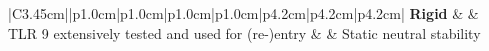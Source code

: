 {\begin{tabular}{|C{3.45cm}||p{1.0cm}|p{1.0cm}|p{1.0cm}|p{1.0cm}|p{4.2cm}|p{4.2cm}|p{4.2cm}|}
		\textbf{\newline \newline Rigid}    &   & TLR 9 \newline extensively tested and used for (re-)entry &               & Static neutral stability \\[13ex] \hline
	\end{tabular}
}

